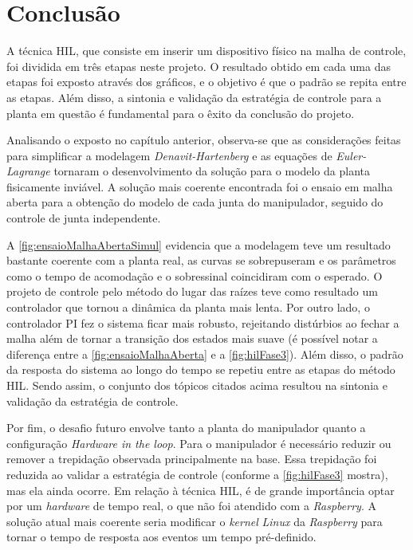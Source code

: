 \chapter{Conclusão}

A técnica HIL, que consiste em inserir um dispositivo físico na malha de controle, foi dividida
em três etapas neste projeto. O resultado obtido em cada uma das etapas foi exposto através
dos gráficos, e o objetivo é que o padrão se repita entre as etapas. Além disso, a sintonia
e validação da estratégia de controle para a planta em questão é fundamental para o êxito da 
conclusão do projeto.

Analisando o exposto no capítulo anterior, observa-se que as considerações feitas para simplificar
a modelagem \textit{Denavit-Hartenberg} e as equações de \textit{Euler-Lagrange} tornaram o desenvolvimento
da solução para o modelo da planta fisicamente inviável. A solução mais coerente encontrada foi o ensaio 
em malha aberta para a obtenção do modelo de cada junta do manipulador, seguido do controle de junta independente.

A \autoref{fig:ensaioMalhaAbertaSimul} evidencia que a modelagem teve um resultado bastante coerente com a planta real, 
as curvas se sobrepuseram e os parâmetros como o tempo de acomodação e o sobressinal coincidiram com o esperado. 
O projeto de controle pelo método do lugar das raízes teve como resultado um controlador que tornou a dinâmica da 
planta mais lenta. Por outro lado, o controlador PI fez o sistema ficar mais robusto, rejeitando distúrbios ao fechar
a malha além de tornar a transição dos estados mais suave (é possível notar a diferença entre a 
\autoref{fig:ensaioMalhaAberta} e a \autoref{fig:hilFase3}). Além disso, o padrão da resposta do sistema ao longo do 
tempo se repetiu entre as etapas do método HIL. Sendo assim, o conjunto dos tópicos citados acima resultou na sintonia e
validação da estratégia de controle.

Por fim, o desafio futuro envolve tanto a planta do manipulador quanto a configuração \textit{Hardware in the loop}. Para o
manipulador é necessário reduzir ou remover a trepidação observada principalmente na base. Essa trepidação foi reduzida ao
validar a estratégia de controle (conforme a \autoref{fig:hilFase3} mostra), mas ela ainda ocorre. Em relação à técnica HIL,
é de grande importância optar por um \textit{hardware} de tempo real, o que não foi atendido com a \textit{Raspberry}. A 
solução atual mais coerente seria modificar o \textit{kernel} \textit{Linux} da \textit{Raspberry} para tornar o tempo 
de resposta aos eventos um tempo pré-definido.



